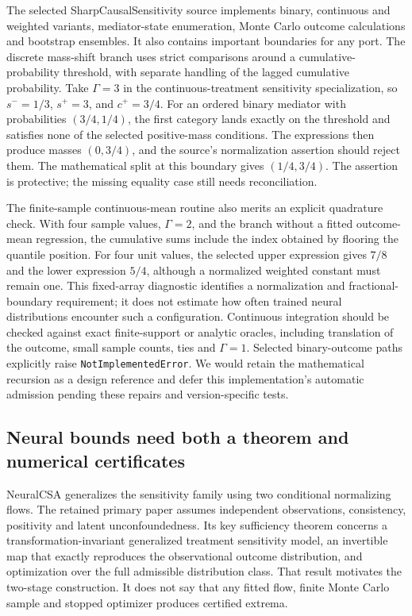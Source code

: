 The selected SharpCausalSensitivity source implements binary, continuous and weighted variants, mediator-state enumeration, Monte Carlo outcome calculations and bootstrap ensembles. It also contains important boundaries for any port. The discrete mass-shift branch uses strict comparisons around a cumulative-probability threshold, with separate handling of the lagged cumulative probability. Take $\Gamma=3$ in the continuous-treatment sensitivity specialization, so $s^-=1/3$, $s^+=3$, and $c^+=3/4$. For an ordered binary mediator with probabilities $(3/4,1/4)$, the first category lands exactly on the threshold and satisfies none of the selected positive-mass conditions. The expressions then produce masses $(0,3/4)$, and the source's normalization assertion should reject them. The mathematical split at this boundary gives $(1/4,3/4)$. The assertion is protective; the missing equality case still needs reconciliation.\cite{exec25_pymed_sharp,exec25_pymed_choice}

The finite-sample continuous-mean routine also merits an explicit quadrature check. With four sample values, $\Gamma=2$, and the branch without a fitted outcome-mean regression, the cumulative sums include the index obtained by flooring the quantile position. For four unit values, the selected upper expression gives $7/8$ and the lower expression $5/4$, although a normalized weighted constant must remain one. This fixed-array diagnostic identifies a normalization and fractional-boundary requirement; it does not estimate how often trained neural distributions encounter such a configuration. Continuous integration should be checked against exact finite-support or analytic oracles, including translation of the outcome, small sample counts, ties and $\Gamma=1$. Selected binary-outcome paths explicitly raise \texttt{NotImplementedError}. We would retain the mathematical recursion as a design reference and defer this implementation's automatic admission pending these repairs and version-specific tests.\cite{exec25_pymed_sharp,exec25_pymed_choice}

\subsection{Neural bounds need both a theorem and numerical certificates}
NeuralCSA generalizes the sensitivity family using two conditional normalizing flows. The retained primary paper assumes independent observations, consistency, positivity and latent unconfoundedness. Its key sufficiency theorem concerns a transformation-invariant generalized treatment sensitivity model, an invertible map that exactly reproduces the observational outcome distribution, and optimization over the full admissible distribution class. That result motivates the two-stage construction. It does not say that any fitted flow, finite Monte Carlo sample and stopped optimizer produces certified extrema.\cite{exec25_pymed_neural_paper}

